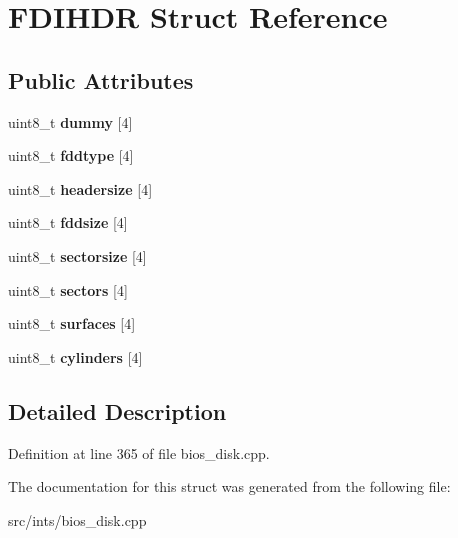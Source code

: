 \hypertarget{structFDIHDR}{\section{F\-D\-I\-H\-D\-R Struct Reference}
\label{structFDIHDR}
}
\subsection*{Public Attributes}
\begin{DoxyCompactItemize}
\item 
\hypertarget{structFDIHDR_a1c884cddb02c6661d8fc9f192b3fc22f}{uint8\-\_\-t {\bfseries dummy} \mbox{[}4\mbox{]}}\label{structFDIHDR_a1c884cddb02c6661d8fc9f192b3fc22f}

\item 
\hypertarget{structFDIHDR_a47545c8404b2ae2f8377e1bcc02fc8f0}{uint8\-\_\-t {\bfseries fddtype} \mbox{[}4\mbox{]}}\label{structFDIHDR_a47545c8404b2ae2f8377e1bcc02fc8f0}

\item 
\hypertarget{structFDIHDR_a09132fda6189c6cec4e4aa2d05868174}{uint8\-\_\-t {\bfseries headersize} \mbox{[}4\mbox{]}}\label{structFDIHDR_a09132fda6189c6cec4e4aa2d05868174}

\item 
\hypertarget{structFDIHDR_a0bc19446daf786a86e01fdfd0f396438}{uint8\-\_\-t {\bfseries fddsize} \mbox{[}4\mbox{]}}\label{structFDIHDR_a0bc19446daf786a86e01fdfd0f396438}

\item 
\hypertarget{structFDIHDR_ac0d70ea816470f23818e513aec16187a}{uint8\-\_\-t {\bfseries sectorsize} \mbox{[}4\mbox{]}}\label{structFDIHDR_ac0d70ea816470f23818e513aec16187a}

\item 
\hypertarget{structFDIHDR_a8df34ba3a180f2c436938eef65b1dd83}{uint8\-\_\-t {\bfseries sectors} \mbox{[}4\mbox{]}}\label{structFDIHDR_a8df34ba3a180f2c436938eef65b1dd83}

\item 
\hypertarget{structFDIHDR_a0075a0f7719ce25a93642b9db90d5000}{uint8\-\_\-t {\bfseries surfaces} \mbox{[}4\mbox{]}}\label{structFDIHDR_a0075a0f7719ce25a93642b9db90d5000}

\item 
\hypertarget{structFDIHDR_aed3de62f3b389214c84acec24434a0ee}{uint8\-\_\-t {\bfseries cylinders} \mbox{[}4\mbox{]}}\label{structFDIHDR_aed3de62f3b389214c84acec24434a0ee}

\end{DoxyCompactItemize}


\subsection{Detailed Description}


Definition at line 365 of file bios\-\_\-disk.\-cpp.



The documentation for this struct was generated from the following file\-:\begin{DoxyCompactItemize}
\item 
src/ints/bios\-\_\-disk.\-cpp\end{DoxyCompactItemize}
